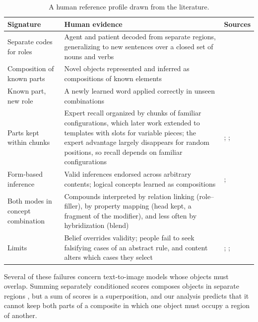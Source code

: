 \documentclass[10pt]{article}
\theoremstyle{plain}
\theoremstyle{remark}
\begin{document}
\label{app:human}
\begin{table}[h]
  \caption{A human reference profile drawn from the literature.}
  \label{tab:human}
  \centering\small
  \begin{tabularx}{\linewidth}{@{}P{3.3cm}YP{3.2cm}@{}}
    \toprule
    Signature & Human evidence & Sources \\
    \midrule
    Separate codes for roles & Agent and patient decoded from separate regions, generalizing to new sentences over a closed set of nouns and verbs & \citet{frankland2015} \\
    Composition of known parts & Novel objects represented and inferred as compositions of known elements & \citet{schwartenbeck2023} \\
    Known part, new role & A newly learned word applied correctly in unseen combinations & \citet{lake2019} \\
    Parts kept within chunks & Expert recall organized by chunks of familiar configurations, which later work extended to templates with slots for variable pieces; the expert advantage largely disappears for random positions, so recall depends on familiar configurations & \citet{chase1973}; \citet{gobet1996templates}; \citet{gobet1996} \\
    Form-based inference & Valid inferences endorsed across arbitrary contents; logical concepts learned as compositions & \citet{rips1994}; \citet{piantadosi2016} \\
    Both modes in concept combination & Compounds interpreted by relation linking (role--filler), by property mapping (head kept, a fragment of the modifier), and less often by hybridization (blend) & \citet{wisniewski1997} \\
    Limits & Belief overrides validity; people fail to seek falsifying cases of an abstract rule, and content alters which cases they select & \citet{evans1983}; \citet{wason1968}; \citet{griggs1982} \\
    \bottomrule
  \end{tabularx}
\end{table}

\noindent
Several of these failures concern text-to-image models whose objects must overlap. Summing separately conditioned scores composes objects in separate regions \citep{liu2022composable}, but a sum of scores is a superposition, and our analysis predicts that it cannot keep both parts of a composite in which one object must occupy a region of another.

\end{document}
